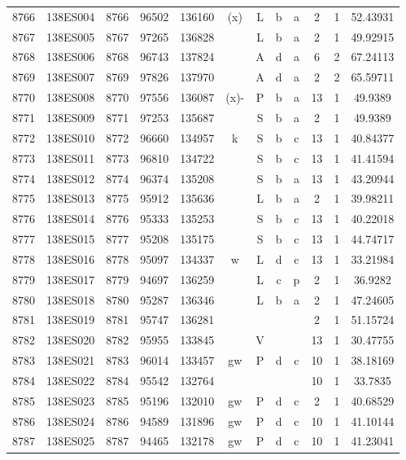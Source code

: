 \begin{tabular}{|*{12}{c|}}
8766 & 138ES004 & 8766 & 96502 & 136160 & (x) & L & b & a & 2 & 1 & 52.43931 \\ 
8767 & 138ES005 & 8767 & 97265 & 136828 &  & L & b & a & 2 & 1 & 49.92915 \\ 
8768 & 138ES006 & 8768 & 96743 & 137824 &  & A & d & a & 6 & 2 & 67.24113 \\ 
8769 & 138ES007 & 8769 & 97826 & 137970 &  & A & d & a & 2 & 2 & 65.59711 \\ 
8770 & 138ES008 & 8770 & 97556 & 136087 & (x)- & P & b & a & 13 & 1 & 49.9389 \\ 
8771 & 138ES009 & 8771 & 97253 & 135687 &  & S & b & a & 2 & 1 & 49.9389 \\ 
8772 & 138ES010 & 8772 & 96660 & 134957 & k & S & b & c & 13 & 1 & 40.84377 \\ 
8773 & 138ES011 & 8773 & 96810 & 134722 &  & S & b & c & 13 & 1 & 41.41594 \\ 
8774 & 138ES012 & 8774 & 96374 & 135208 &  & S & b & a & 13 & 1 & 43.20944 \\ 
8775 & 138ES013 & 8775 & 95912 & 135636 &  & L & b & a & 2 & 1 & 39.98211 \\ 
8776 & 138ES014 & 8776 & 95333 & 135253 &  & S & b & c & 13 & 1 & 40.22018 \\ 
8777 & 138ES015 & 8777 & 95208 & 135175 &  & S & b & c & 13 & 1 & 44.74717 \\ 
8778 & 138ES016 & 8778 & 95097 & 134337 & w & L & d & c & 13 & 1 & 33.21984 \\ 
8779 & 138ES017 & 8779 & 94697 & 136259 &  & L & c & p & 2 & 1 & 36.9282 \\ 
8780 & 138ES018 & 8780 & 95287 & 136346 &  & L & b & a & 2 & 1 & 47.24605 \\ 
8781 & 138ES019 & 8781 & 95747 & 136281 &  &  &  &  & 2 & 1 & 51.15724 \\ 
8782 & 138ES020 & 8782 & 95955 & 133845 &  & V &  &  & 13 & 1 & 30.47755 \\ 
8783 & 138ES021 & 8783 & 96014 & 133457 & gw & P & d & c & 10 & 1 & 38.18169 \\ 
8784 & 138ES022 & 8784 & 95542 & 132764 &  &  &  &  & 10 & 1 & 33.7835 \\ 
8785 & 138ES023 & 8785 & 95196 & 132010 & gw & P & d & c & 2 & 1 & 40.68529 \\ 
8786 & 138ES024 & 8786 & 94589 & 131896 & gw & P & d & c & 10 & 1 & 41.10144 \\ 
8787 & 138ES025 & 8787 & 94465 & 132178 & gw & P & d & c & 10 & 1 & 41.23041 \\ 

\end{tabular}

